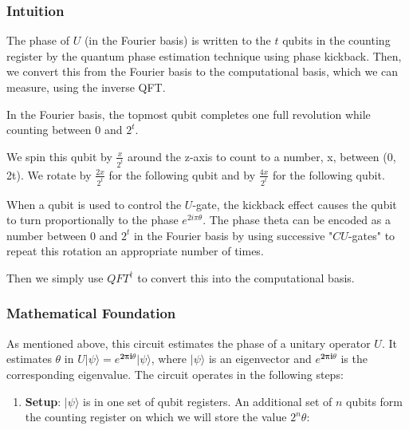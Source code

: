 \documentclass{article}
\begin{document}
\hypertarget{intuition}{%

\subsubsection{\texorpdfstring{Intuition
}{}}\label{intuition}}

The phase of \(U\) (in the Fourier basis) is written to the \(t\) qubits in the counting register by the quantum phase estimation technique using phase kickback.
Then, we convert this from the Fourier basis to the computational basis, which we can measure, using the inverse QFT.

In the Fourier basis, the topmost qubit completes one full revolution while counting between \(0\) and \(2^t\). 

We spin this qubit by \(\tfrac{x}{2^t}\) around the z-axis to count to a number, x, between (0, 2t). We rotate by \(\tfrac{2x}{2^t}\) for the following qubit and by \(\tfrac{4x}{2^t}\) for the following qubit.


When a qubit is used to control the \(U\)-gate, the kickback effect causes the qubit to turn proportionally to the phase \(e^{2i\pi\theta}\).
The phase theta can be encoded as a number between \(0\) and \(2^t\) in the Fourier basis by using successive "\(CU\)-gates" to repeat this rotation an appropriate number of times.

Then we simply use \(QFT^\dagger\) to convert this into the
computational basis.

\hypertarget{mathematical-foundation}{%
\subsubsection{\texorpdfstring{Mathematical Foundation
}{}}\label{mathematical-foundation}}

As mentioned above, this circuit estimates the phase of a unitary
operator \(U\). It estimates \(\theta\) in
\(U\vert\psi \rangle =e^{\boldsymbol{2\pi i} \theta }|\psi \rangle\),
where \(|\psi\rangle\) is an eigenvector and
\(e^{\boldsymbol{2\pi i}\theta}\) is the corresponding eigenvalue. The
circuit operates in the following steps:

\begin{enumerate}
\def\labelenumi{\roman{enumi}.}
\tightlist
\item
  \textbf{Setup}: \(\vert\psi\rangle\) is in one set of qubit registers.
  An additional set of \(n\) qubits form the counting register on which
  we will store the value \(2^n\theta\):
\end{enumerate}
\end{document}
